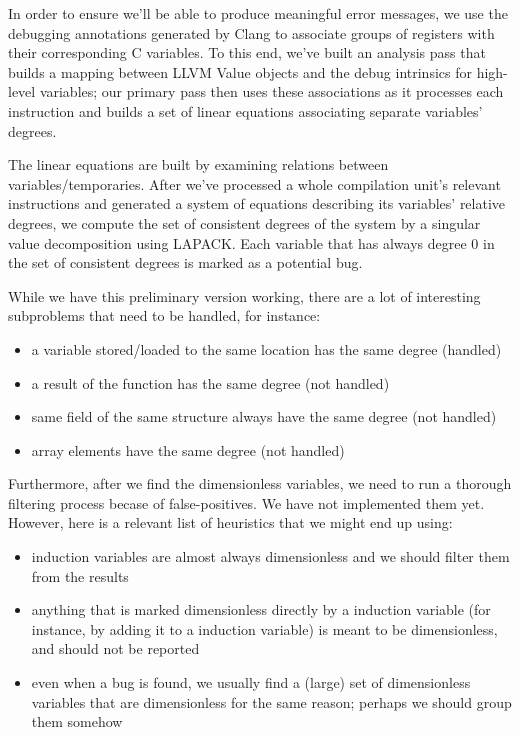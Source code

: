 \documentclass[12pt]{article}
\begin{document}
In order to ensure we'll be able to produce meaningful error messages, we use the debugging annotations generated by Clang to associate groups of registers with their corresponding C variables.
To this end, we've built an analysis pass that builds a mapping between LLVM Value objects and the debug intrinsics for high-level variables; our primary pass then uses these associations as it processes each instruction and builds a set of linear equations associating separate variables' degrees.

The linear equations are built by examining relations between variables/temporaries. After we've processed a whole compilation unit's relevant instructions and generated a system of equations describing its variables' relative degrees, we compute the set of consistent degrees of the system by a singular value decomposition using LAPACK. Each variable that has always degree 0 in the set of consistent degrees is marked as a potential bug.

While we have this preliminary version working, there are a lot of interesting subproblems that need to be handled, for instance:
\begin{itemize}
  \item a variable stored/loaded to the same location has the same degree (handled)
  \item a result of the function has the same degree (not handled)
  \item same field of the same structure always have the same degree (not handled)
  \item array elements have the same degree (not handled)
\end{itemize}

Furthermore, after we find the dimensionless variables, we need to run a thorough filtering process becase of false-positives. We have not implemented them yet. However, here is a relevant list of heuristics that we might end up using:
\begin{itemize}
  \item induction variables are almost always dimensionless and we should filter them from the results
  \item anything that is marked dimensionless directly by a induction variable (for instance, by adding it to a induction variable) is meant to be dimensionless, and should not be reported
  \item even when a bug is found, we usually find a (large) set of dimensionless variables that are dimensionless for the same reason; perhaps we should group them somehow
\end{itemize}
\end{document}
